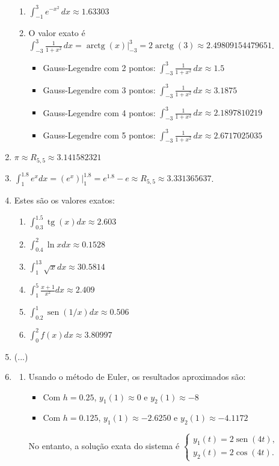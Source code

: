 \documentclass[12pt,a4paper]{article}
\newcommand{\fixme}{{\color{red}(...)}}
\newcommand*\sen{\operatorname{sen}}
\newcommand*\tg{\operatorname{tg}}
\newcommand*\arctg{\operatorname{arctg}}
\begin{document}
\begin{enumerate}
\begin{enumerate}
\item $\int_{-1}^3 e^{-x^2}\,dx \approx 1.63303$
\item O valor exato é $\int_{-3}^3 \frac{1}{1+x^2} \,dx = \arctg(x) \Big|_{-3}^3 = 2 \arctg(3) \approx 2.49809154479651$.
\begin{itemize}
\item Gauss-Legendre com 2 pontos: $\int_{-3}^3 \frac{1}{1+x^2} \,dx \approx 1.5$
\item Gauss-Legendre com 3 pontos: $\int_{-3}^3 \frac{1}{1+x^2} \,dx \approx 3.1875$ 
\item Gauss-Legendre com 4 pontos: $\int_{-3}^3 \frac{1}{1+x^2} \,dx \approx 2.1897810219$
\item Gauss-Legendre com 5 pontos: $\int_{-3}^3 \frac{1}{1+x^2} \,dx \approx 2.6717025035$
\end{itemize}
\end{enumerate}
\item $\pi \approx R_{5,5} \approx 3.141582321$
\item $\int_1^{1.8} e^x dx
= \left(e^x \right)\Big|_{1}^{1.8}
= e^{1.8} - e
\approx R_{5,5}
\approx 3.331365637$.
\item Estes são os valores exatos:
\begin{enumerate}
\item $\int_{0.3}^{1.5} \tg(x) dx \approx 2.603$
\item $\int_{0.4}^{2} \ln{x} dx \approx 0.1528$
\item $\int_{1}^{13} \sqrt{x} dx \approx 30.5814$
\item $\int_1^5 \frac{x+1}{x^2} dx \approx 2.409$
\item $\int_{0.2}^{1} \sen(1/x) dx \approx 0.506$
\item $\int_{0}^{2} f(x) dx \approx 3.80997$
\end{enumerate}
\item \fixme
\item \begin{enumerate}
\item Usando o método de Euler, os resultados aproximados são:
\begin{itemize}
\item Com $h=0.25$, $y_1(1) \approx 0$ e $y_2(1) \approx -8$
\item Com $h=0.125$, $y_1(1) \approx -2.6250$ e $y_2(1) \approx -4.1172$
\end{itemize}

No entanto, a solução exata do sistema é
$\begin{cases}
y_1(t) = 2\sen(4t),\\
y_2(t) = 2\cos(4t).
\end{cases}$


\end{enumerate}
\end{enumerate}
\end{document}
